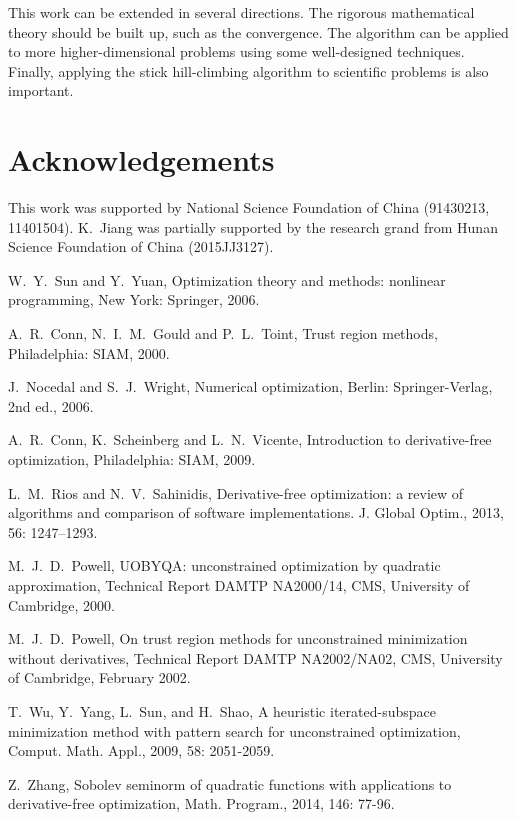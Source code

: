 \documentclass[mathpazo]{aamm}
\begin{document}
This work can be extended in several directions. The rigorous
mathematical theory should be built up, such as the convergence.
The algorithm can be applied to more higher-dimensional problems
using some well-designed techniques. Finally, applying the stick
hill-climbing algorithm to scientific problems is also
important.


\section*{Acknowledgements}
This work was supported by National Science Foundation of China 
(91430213, 11401504).
K.~Jiang was partially supported by the research grand from Hunan Science Foundation of China (2015JJ3127).


\begin{thebibliography}{99}

W.~Y.~Sun and Y.~Yuan,
Optimization theory and methods: nonlinear programming,
New York: Springer, 2006.

A.~R.~Conn, N.~I.~M.~Gould and P.~L.~Toint,
Trust region methods, Philadelphia: SIAM, 2000.

J.~Nocedal and S.~J.~Wright,
Numerical optimization, 
Berlin: Springer-Verlag, 2nd ed., 2006.

A.~R.~Conn, K.~Scheinberg and L.~N.~Vicente,
Introduction to derivative-free optimization,
Philadelphia: SIAM, 2009.

L.~M.~Rios and N.~V.~Sahinidis,
Derivative-free optimization: a review of algorithms and comparison
  of software implementations.
{J. Global Optim.}, 2013, 56: 1247--1293.

M.~J.~D.~Powell, UOBYQA: unconstrained optimization by quadratic
approximation, Technical Report DAMTP NA2000/14, CMS, University
of Cambridge, 2000.

M.~J.~D.~Powell, On trust region methods for unconstrained
minimization without derivatives, Technical Report DAMTP
NA2002/NA02, CMS, University of Cambridge, February 2002.

T.~Wu, Y.~Yang, L.~Sun, and H.~Shao, A heuristic
iterated-subspace minimization method with pattern search for
unconstrained optimization, 
Comput. Math. Appl., 2009, 58: 2051-2059.

Z.~Zhang, Sobolev seminorm of quadratic functions with
applications to derivative-free optimization, Math. Program.,
2014, 146: 77-96.


\end{thebibliography}
\end{document}
